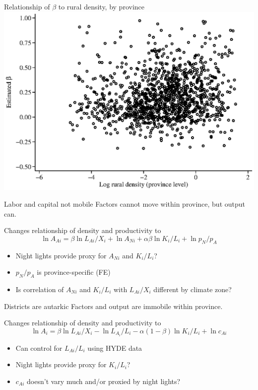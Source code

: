 \documentclass[10pt, xcolor=dvipsnames]{beamer}
\begin{document}
\begin{frame}{Relationship of $\beta$ to rural density, by province}\label{rurdbeta}
\includegraphics[width=.8\textwidth]{fig_beta_rurd.eps}
\hfill \hyperlink{eos}{}
\end{frame}

\begin{frame}{Labor and capital not mobile}\label{nonmobile}
Factors cannot move within province, but output can.

\vspace{.2cm} Changes relationship of density and productivity to
\begin{equation}
  \ln A_{Ai} = \beta \ln L_{Ai}/X_i + \ln A_{Ni} + \alpha\beta \ln K_i/L_i + \ln p_N/p_A \nonumber
\end{equation}
\begin{itemize}
  \item Night lights provide proxy for $A_{Ni}$ and $K_i/L_i$?
  \item $p_N/p_A$ is province-specific (FE)
  \item Is correlation of $A_{Ni}$ and $K_i/L_i$ with $L_{Ai}/X_i$ different by climate zone?
\end{itemize}

\hfill \hyperlink{robustness}{}
\end{frame}

\begin{frame}{Districts are autarkic}\label{autarky}
Factors and output are immobile within province.

\vspace{.2cm} Changes relationship of density and productivity to
\begin{equation}
\ln A_i = \beta \ln L_{Ai}/X_i - \ln L_{A_i}/L_i - \alpha(1-\beta) \ln K_{i}/L_{i} + \ln c_{Ai} \nonumber
\end{equation}
\begin{itemize}
  \item Can control for $L_{Ai}/L_i$ using HYDE data
  \item Night lights provide proxy for $K_i/L_i$?
  \item $c_{Ai}$ doesn't vary much and/or proxied by night lights?
\end{itemize}

\hfill \hyperlink{robustness}{}
\end{frame}
\end{document}
